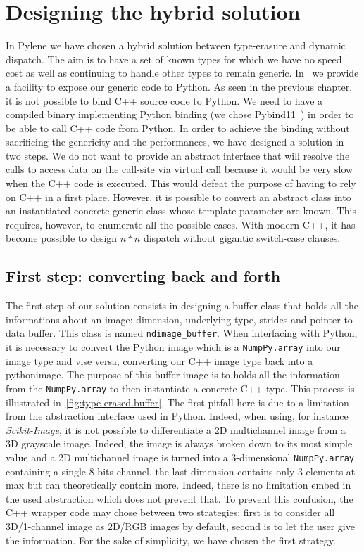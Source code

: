 \section{Designing the hybrid solution}

In Pylene we have chosen a hybrid solution between type-erasure and dynamic dispatch. The aim is to have a set of known
types for which we have no speed cost as well as continuing to handle other types to remain generic.
In~\cite{gossec.2019.pybind} we provide a facility to expose our generic code to Python. As seen in the previous
chapter, it is not possible to bind C++ source code to Python. We need to have a compiled binary implementing Python
binding (we chose Pybind11~\parencite{jakob.2017.pybind11}) in order to be able to call C++ code from Python. In order
to achieve the binding without sacrificing the genericity and the performances, we have designed a solution in two
steps. We do not want to provide an abstract interface that will resolve the calls to access data on the call-site via
virtual call because it would be very slow when the C++ code is executed. This would defeat the purpose of having to
rely on C++ in a first place. However, it is possible to convert an abstract class into an instantiated concrete generic
class whose template parameter are known. This requires, however, to enumerate all the possible cases. With modern C++,
it has become possible to design $n*n$ dispatch without gigantic switch-case clauses.


\subsection{First step: converting back and forth}

The first step of our solution consists in designing a buffer class that holds all the informations about an image:
dimension, underlying type, strides and pointer to data buffer. This class is named \texttt{ndimage\_buffer}. When
interfacing with Python, it is necessary to convert the Python image which is a \texttt{NumpPy.array} into our image
type and vise versa, converting our C++ image type back into a pythonimage. The purpose of this buffer image is to holds
all the information from the \texttt{NumpPy.array} to then instantiate a concrete C++ type. This process is illustrated
in~\cref{fig:type-erased.buffer}. The first pitfall here is due to a limitation from the abstraction interface used in
Python. Indeed, when using, for instance \emph{Scikit-Image}, it is not possible to differentiate a 2D multichannel
image from a 3D grayscale image. Indeed, the image is always broken down to its most simple value and a 2D multichannel
image is turned into a 3-dimensional \texttt{NumpPy.array} containing a single 8-bits channel, the last dimension
contains only 3 elements at max but can theoretically contain more. Indeed, there is no limitation embed in the used
abstraction which does not prevent that. To prevent this confusion, the C++ wrapper code may chose between two
strategies; first is to consider all 3D/1-channel image as 2D/RGB images by default, second is to let the user give the
information. For the sake of simplicity, we have chosen the first strategy.

